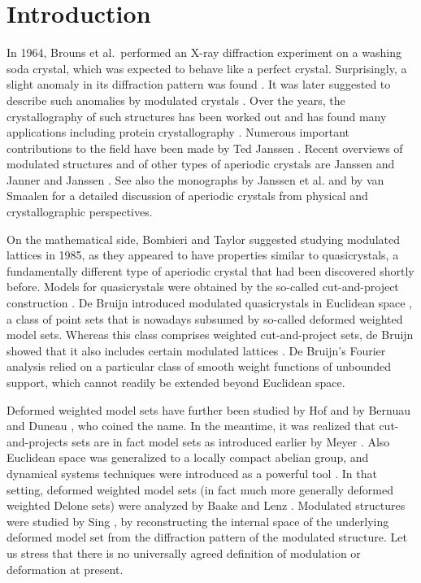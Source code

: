 \documentclass[11pt, a4wide]{amsart}
\numberwithin{lemma}{section}
\begin{document}
\maketitle


\section{Introduction}


In 1964, Brouns et al.~performed an X-ray diffraction experiment on a  washing soda crystal, which was expected to behave like a perfect crystal. Surprisingly, a slight anomaly in its diffraction pattern was found \cite{BVW64}. It was later suggested to describe such anomalies by modulated crystals \cite{W74,JJ77}. Over the years, the crystallography of such structures has been worked out and has found many applications including protein crystallography \cite{Lea07}. Numerous important contributions to the field have been made by Ted Janssen \cite{Sou18}.
Recent overviews of modulated structures and of other types of aperiodic crystals are Janssen \cite{J12} and Janner and Janssen \cite{JJ14}. See also the monographs by Janssen et al. \cite{JCB07} and by van Smaalen \cite{vS07} for a detailed discussion of aperiodic crystals  from physical and crystallographic perspectives.

\smallskip

On the mathematical side, Bombieri and Taylor \cite{BT87} suggested studying modulated lattices in 1985, as they appeared to have properties similar to quasicrystals, a fundamentally different type of aperiodic crystal that had been discovered shortly before. Models for quasicrystals were obtained by the so-called cut-and-project construction \cite{KN,DK}. De Bruijn introduced modulated quasicrystals in Euclidean space \cite{dB87}, a class of point sets that is nowadays subsumed by so-called deformed weighted model sets. Whereas this class comprises weighted cut-and-project sets, de Bruijn showed that it also includes certain modulated lattices \cite[Sec.~5,6]{dB87}.
De Bruijn's Fourier analysis relied on a particular class of smooth weight functions of unbounded support, which cannot readily be extended beyond Euclidean space.

\smallskip


Deformed weighted model sets have further been studied by Hof \cite{Hof3} and by Bernuau and Duneau \cite{BD}, who coined the name.
In the meantime, it was realized that cut-and-projects sets are in fact model sets as introduced earlier by Meyer \cite{Meyer,Moody-old,Moody-model sets}. Also Euclidean space was generalized to a locally compact abelian group, and dynamical systems techniques were introduced as a powerful tool \cite{Ro96,Martin2}. In that setting, deformed weighted model sets (in fact much more generally deformed weighted Delone sets) were analyzed by Baake and Lenz \cite{BL2}. Modulated structures were studied by Sing \cite{SW06,WS07,S08}, by reconstructing the internal space of the underlying deformed model set from the diffraction pattern of the modulated structure. Let us stress that there is no universally agreed definition of modulation or deformation at present.
\end{document}
